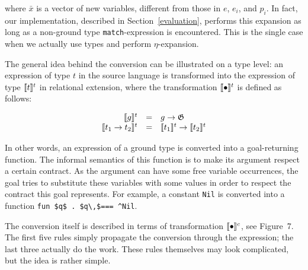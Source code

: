 \noindent where $\bar{x}$ is a vector of new variables, different from those in $e$, $e_i$, and $p_i$. In fact, our implementation,
described in Section~\ref{evaluation}, performs this expansion as long as a non-ground type \lstinline|match|-expression is encountered. 
This is the single case when we actually use types and perform $\eta$-expansion.

The general idea behind the conversion can be illustrated on a type level: an expression of type $t$ in the source
language is transformed into the expression of type $\llbracket{t}\rrbracket^t$ in relational extension, where
the transformation $\llbracket{\bullet}\rrbracket^t$ is defined as follows:

$$
\begin{array}{rcl}
\llbracket{g}\rrbracket^t                     & = & g \to \mathfrak G \\
\llbracket{t_1 \to t_2}\rrbracket^t           & = & \llbracket{t_1}\rrbracket^t \to \llbracket{t_2}\rrbracket^t \\
\end{array}
$$

In other words, an expression of a ground type is converted into a goal-returning function. The informal semantics
of this function is to make its argument respect a certain contract. As the argument can have some free variable occurrences, 
the goal tries to substitute these variables with some values in order to respect the contract this goal represents. 
For example, a constant \lstinline|Nil| is converted into a function \lstinline|fun $q$ . $q\,$=== ^Nil|.

The conversion itself is described in terms of transformation $\llbracket{\bullet}\rrbracket^c$, see Figure~7.%
The first five rules
simply propagate the conversion through the expression; the last three actually do the work. These rules themselves may look complicated,
but the idea is rather simple.


